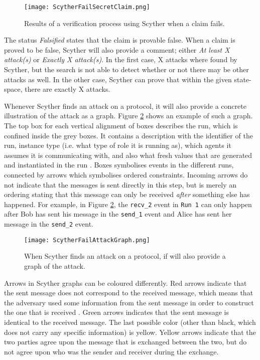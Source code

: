 \begin{figure}[h]
	\centering
	\texttt{[image: ScytherFailSecretClaim.png]}
	\caption{Results of a verification process using Scyther when a claim fails.}
	\label{fig:scyther-verify-claims-fail}
\end{figure}

The status \emph{Falsified} states that the claim is provable false. When a claim is proved to be false, Scyther will also provide a comment; either \emph{At least X attack(s)} or \emph{Exactly X attack(s)}. In the first case, X attacks where found by Scyther, but the search is not able to detect whether or not there may be other attacks as well. In the other case, Scyther can prove that within the given state-space, there are exactly X attacks.

Whenever Scyther finds an attack on a protocol, it will also provide a concrete illustration of the attack as a graph. Figure \ref{fig:scyther-graph} shows an example of such a graph. The top box for each vertical alignment of boxes describes the run, which is confined inside the grey boxes. It contains a description with the identifier of the run, instance type (i.e. what type of role it is running as), which agents it assumes it is communicating with, and also what fresh values that are generated and instantiated in the run \cite{scyther-manual}. Boxes symbolises events in the different runs, connected by arrows which symbolises ordered constraints. Incoming arrows do not indicate that the messages is sent directly in this step, but is merely an ordering stating that this message can only be received \emph{after} something else has happened. For example, in Figure \ref{fig:scyther-graph}, the \texttt{recv\_2} event in \texttt{Run 1} can only happen after Bob has sent his message in the \texttt{send\_1} event and Alice has sent her message in the \texttt{send\_2} event.



\begin{figure}[h]
	\centering
	\texttt{[image: ScytherFailAttackGraph.png]}
	\caption{When Scyther finds an attack on a protocol, if will also provide a graph of the attack.}
	\label{fig:scyther-graph}
\end{figure}

Arrows in Scyther graphs can be coloured differently. Red arrows indicate that the sent message does not correspond to the received message, which means that the adversary used some information from the sent message in order to construct the one that is received \cite{scyther-manual}. Green arrows indicates that the sent message is identical to the received message. The last possible color (other than black, which does not carry any specific information) is yellow. Yellow arrows indicate that the two parties agree upon the message that is exchanged between the two, but do not agree upon who was the sender and receiver during the exchange.

